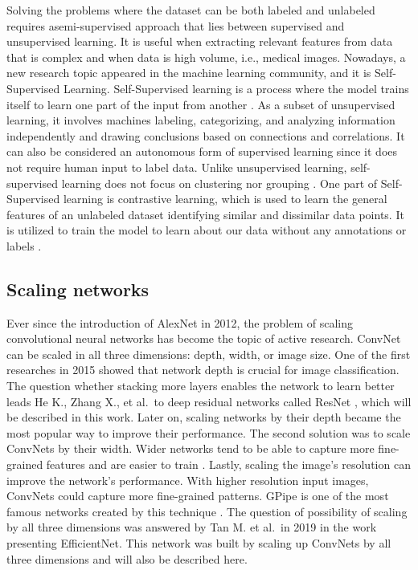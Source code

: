 \documentclass[
]{krantz}
\begin{document}
Solving the problems where the dataset can be both labeled and unlabeled requires asemi-supervised approach that lies between supervised and unsupervised learning. It is useful when extracting relevant features from data that is complex and when data is high volume, i.e., medical images.
Nowadays, a new research topic appeared in the machine learning community, and it is Self-Supervised Learning. Self-Supervised learning is a process where the model trains itself to learn one part of the input from another \citet{selfsup}. As a subset of unsupervised learning, it involves machines labeling, categorizing, and analyzing information independently and drawing conclusions based on connections and correlations. It can also be considered an autonomous form of supervised learning since it does not require human input to label data. Unlike unsupervised learning, self-supervised learning does not focus on clustering nor grouping \citet{selfsup2}. One part of Self-Supervised learning is contrastive learning, which is used to learn the general features of an unlabeled dataset identifying similar and dissimilar data points. It is utilized to train the model to learn about our data without any annotations or labels \citet{contrastive}.

\hypertarget{scaling-networks}{%
\subsection{Scaling networks}\label{scaling-networks}}

Ever since the introduction of AlexNet in 2012, the problem of scaling convolutional neural networks has become the topic of active research. ConvNet can be scaled in all three dimensions: depth, width, or image size. One of the first researches in 2015 showed that network depth is crucial for image classification. The question whether stacking more layers enables the network to learn better leads He K., Zhang X., et al.~to deep residual networks called ResNet \citep{ResNet}, which will be described in this work. Later on, scaling networks by their depth became the most popular way to improve their performance.
The second solution was to scale ConvNets by their width. Wider networks tend to be able to capture more fine-grained features and are easier to train \citet{width}.
Lastly, scaling the image's resolution can improve the network's performance. With higher resolution input images, ConvNets could capture more fine-grained patterns. GPipe is one of the most famous networks created by this technique \citet{gpipe}.
The question of possibility of scaling by all three dimensions was answered by Tan M. et al.~in 2019 in the work presenting EfficientNet. This network was built by scaling up ConvNets by all three dimensions and will also be described here.
\end{document}
